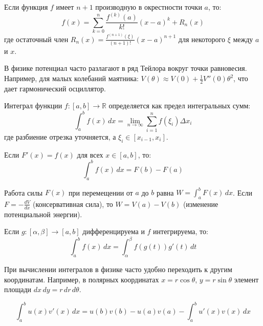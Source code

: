 \documentclass[11pt, a4paper]{extarticle}
\newcommand{\al}{\alpha}
\newcommand{\be}{\beta}
\newcommand{\R}{{\mathbb R}}
\begin{document}
\begin{theorem}
Если функция $f$ имеет $n+1$ производную в окрестности точки $a$, то:
$$f(x) = \sum_{k=0}^n \frac{f^{(k)}(a)}{k!}(x - a)^k + R_n(x)$$
где остаточный член $R_n(x) = \frac{f^{(n+1)}(\xi)}{(n+1)!}(x - a)^{n+1}$ для некоторого $\xi$ между $a$ и $x$.
\end{theorem}

\begin{example}
В физике потенциал часто разлагают в ряд Тейлора вокруг точки равновесия. Например, для малых колебаний маятника: $V(\theta) \approx V(0) + \frac{1}{2}V''(0)\theta^2$, что дает гармонический осциллятор.
\end{example}

\begin{definition}
Интеграл функции $f: [a, b] \to \R$ определяется как предел интегральных сумм:
$$\int_a^b f(x) \, dx = \lim_{n \to \infty} \sum_{i=1}^n f(\xi_i) \Delta x_i$$
где разбиение отрезка уточняется, а $\xi_i \in [x_{i-1}, x_i]$.
\end{definition}

\begin{theorem}
Если $F'(x) = f(x)$ для всех $x \in [a, b]$, то:
$$\int_a^b f(x) \, dx = F(b) - F(a)$$
\end{theorem}

\begin{example}
Работа силы $F(x)$ при перемещении от $a$ до $b$ равна $W = \int_a^b F(x) \, dx$. Если $F = -\frac{dV}{dx}$ (консервативная сила), то $W = V(a) - V(b)$ (изменение потенциальной энергии).
\end{example}

\begin{theorem}
Если $g: [\al, \be] \to [a, b]$ дифференцируема и $f$ интегрируема, то:
$$\int_a^b f(x) \, dx = \int_{\al}^{\be} f(g(t)) g'(t) \, dt$$
\end{theorem}

\begin{example}
При вычислении интегралов в физике часто удобно переходить к другим координатам. Например, в полярных координатах $x = r\cos\theta$, $y = r\sin\theta$ элемент площади $dx \, dy = r \, dr \, d\theta$.
\end{example}

\begin{theorem}
$$\int_a^b u(x) v'(x) \, dx = u(b)v(b) - u(a)v(a) - \int_a^b u'(x) v(x) \, dx$$
\end{theorem}
\end{document}
